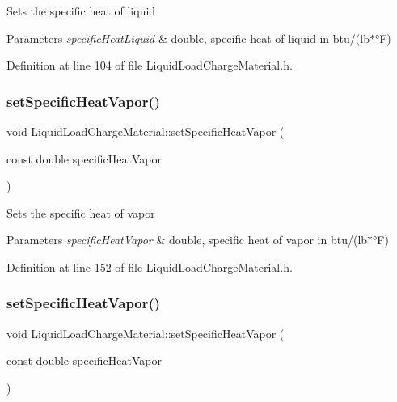 Sets the specific heat of liquid 
\begin{DoxyParams}{Parameters}
{\em specific\+Heat\+Liquid} & double, specific heat of liquid in btu/(lb$\ast$°F) \\
\hline
\end{DoxyParams}


Definition at line 104 of file Liquid\+Load\+Charge\+Material.\+h.

\mbox{\label{class_liquid_load_charge_material_ae95faf01cf6293ab282b1b7fe3b849e1}} 
\subsubsection{\texorpdfstring{set\+Specific\+Heat\+Vapor()}{setSpecificHeatVapor()}\hspace{0.1cm}{\footnotesize\ttfamily [1/3]}}
{\footnotesize\ttfamily void Liquid\+Load\+Charge\+Material\+::set\+Specific\+Heat\+Vapor (\begin{DoxyParamCaption}\item[{const double}]{specific\+Heat\+Vapor }\end{DoxyParamCaption})\hspace{0.3cm}{\ttfamily [inline]}}

Sets the specific heat of vapor 
\begin{DoxyParams}{Parameters}
{\em specific\+Heat\+Vapor} & double, specific heat of vapor in btu/(lb$\ast$°F) \\
\hline
\end{DoxyParams}


Definition at line 152 of file Liquid\+Load\+Charge\+Material.\+h.

\mbox{\label{class_liquid_load_charge_material_ae95faf01cf6293ab282b1b7fe3b849e1}} 
\subsubsection{\texorpdfstring{set\+Specific\+Heat\+Vapor()}{setSpecificHeatVapor()}\hspace{0.1cm}{\footnotesize\ttfamily [2/3]}}
{\footnotesize\ttfamily void Liquid\+Load\+Charge\+Material\+::set\+Specific\+Heat\+Vapor (\begin{DoxyParamCaption}\item[{const double}]{specific\+Heat\+Vapor }\end{DoxyParamCaption})\hspace{0.3cm}{\ttfamily [inline]}}

